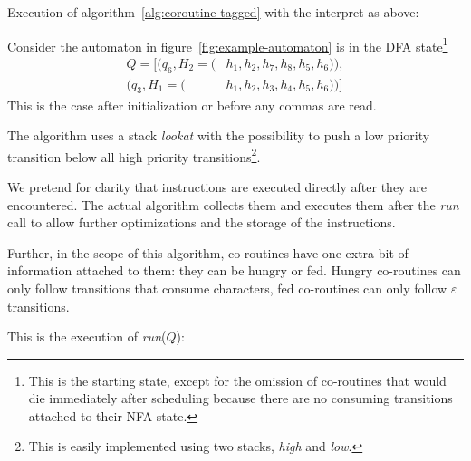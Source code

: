 \documentclass[11pt,a4paper,twoside,openright]{Thesis}
\theoremstyle{definition}
\begin{document}
\begin{example} Execution of algorithm~\ref{alg:coroutine-tagged} with the
  interpret as above:

Consider the automaton in figure~\ref{fig:example-automaton} is in
the DFA state\footnote{This is the starting state, except for the omission of
co-routines that would die immediately after scheduling because there are no
consuming transitions attached to their NFA state.}
\begin{align*}
Q=[
	(q_6, H_2=(&h_1, h_2, h_7,  h_8, h_5, h_6)), \\
	(q_3, H_1=(&h_1, h_2, h_3,  h_4, h_5, h_6))]
	\end{align*}
This is the case after initialization or before any commas are read.

The algorithm uses a stack \emph{lookat} with the possibility to push a low
priority transition below all high priority transitions\footnote{This is
easily implemented using two stacks, \emph{high} and \emph{low}.}.

We pretend for clarity that instructions are executed directly
after they are encountered.  The actual algorithm collects them and
executes them after the \emph{run} call to allow further
optimizations and the storage of the instructions.

Further, in the scope of this algorithm, co-routines have one extra bit of
information attached to them: they can be hungry or fed. Hungry co-routines can
only follow transitions that consume characters, fed co-routines can only
follow $\varepsilon$ transitions.

This is the execution of \emph{run}($Q$):


\end{example}
\end{document}
